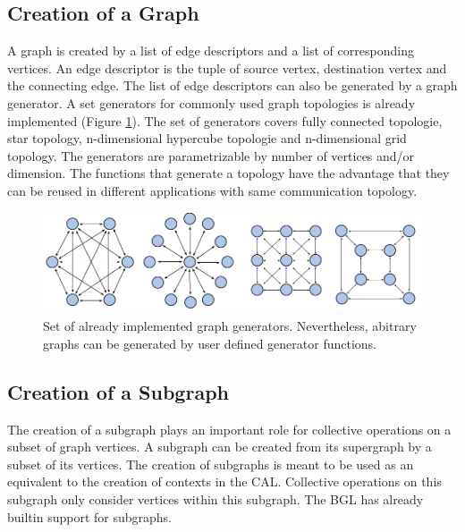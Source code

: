 \subsection{Creation of a Graph}
A graph is created by a list of edge descriptors and a list of
corresponding vertices. An edge descriptor is the tuple of source
vertex, destination vertex and the connecting edge. The list of edge
descriptors can also be generated by a graph generator. A set
generators for commonly used graph topologies is already implemented
(Figure \ref{fig:topologies}).  The set of generators covers fully
connected topologie, star topology, n-dimensional hypercube topologie
and n-dimensional grid topology.  The generators are parametrizable by
number of vertices and/or dimension.  The functions that generate a
topology have the advantage that they can be reused in different
applications with same communication topology.

\begin{figure}[H]
  \centering
  \includegraphics[width=\textwidth]{graphics/40_topologies}
  \caption{Set of already implemented graph generators. Nevertheless,
  abitrary graphs can be generated by user defined generator functions.}
  \label{fig:topologies}
\end{figure}

\subsection{Creation of a Subgraph}
The creation of a subgraph plays an important role for collective
operations on a subset of graph vertices. A subgraph can be created
from its supergraph by a subset of its vertices.  The creation of
subgraphs is meant to be used as an equivalent to the creation of
contexts in the CAL. Collective operations on this subgraph only
consider vertices within this subgraph. The BGL has already builtin
support for subgraphs.

